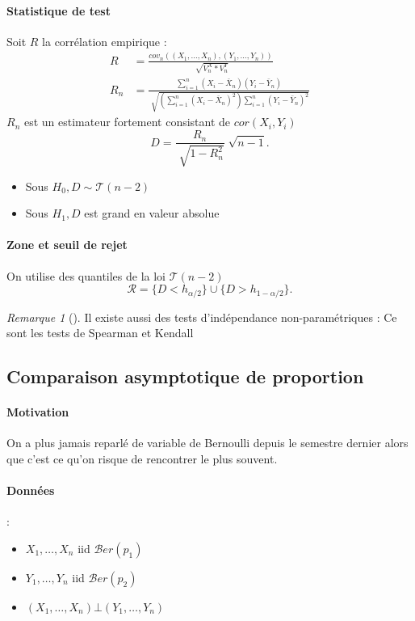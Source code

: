 \documentclass{article}
\theoremstyle{plain}%
\theoremstyle{definition}
\theoremstyle{remark}
\newtheorem*{rem}{Remarque}
\begin{document}
\paragraph*{Statistique de test}
Soit $ R $ la corrélation empirique :
\begin{align*}
    R &= \frac{cov_n( (X_1, \dots, X_n), (Y_1, \dots, Y_n) )}{\sqrt[]{V_n^X*V_n^Y}} \\
    R_n &= \frac{\sum_{i=1}^{n} (X_i - \bar{X}_n) (Y_i - \bar{Y}_n)}{\sqrt[]{(\sum_{i=1}^{n} (X_i - \bar{X}_n)^2) \sum_{i=1}^{n} (Y_i - \bar{Y}_n)^2 }}
\end{align*}
$ R_n $ est un estimateur fortement consistant de $ cor(X_i, Y_i) $
\[
    D = \frac{R_n}{\sqrt[]{1 - R_n^2}} \sqrt[]{n-1}
.\]
\begin{itemize}
    \item Sous $ H_0, D \sim \mathcal{T}(n-2) $ 
    \item Sous $ H_1, D $ est grand en valeur absolue
\end{itemize}

\paragraph*{Zone et seuil de rejet}
On utilise des quantiles de la loi $ \mathcal{T}(n-2) $
\[
    \mathcal{R} = \{ D < h_{\alpha /2} \} \cup \{D > h_{1 - \alpha /2 }\}
.\]

\begin{rem}[]
    Il existe aussi des tests d'indépendance non-paramétriques : Ce sont les tests de Spearman et Kendall
\end{rem}

\subsection{Comparaison asymptotique de proportion}
\paragraph*{Motivation} On a plus jamais reparlé de variable de Bernoulli depuis le semestre dernier alors que c'est ce qu'on risque de rencontrer le plus souvent.
\paragraph*{Données}: \begin{itemize}
    \item $ X_1, \dots, X_n $ iid $ \mathcal{B}er(p_1) $ 
    \item $ Y_1, \dots, Y_n $ iid $ \mathcal{B}er(p_2) $ 
    \item $ (X_1, \dots, X_n) \bot (Y_1, \dots, Y_n) $
\end{itemize}
\end{document}
